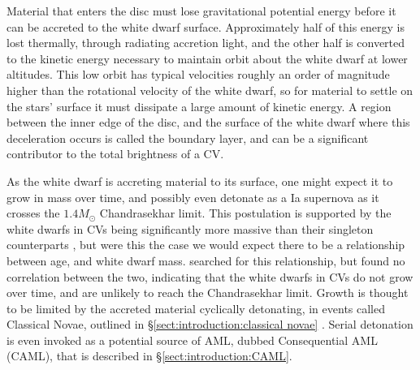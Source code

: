 Material that enters the disc must lose gravitational potential energy before it can be accreted to the white dwarf surface. Approximately half of this energy is lost thermally, through radiating accretion light, and the other half is converted to the kinetic energy necessary to maintain orbit about the white dwarf at lower altitudes. This low orbit has typical velocities roughly an order of magnitude higher than the rotational velocity of the white dwarf, so for material to settle on the stars' surface it must dissipate a large amount of kinetic energy. A region between the inner edge of the disc, and the surface of the white dwarf where this deceleration occurs is called the boundary layer, and can be a significant contributor to the total brightness of a CV. 

As the white dwarf is accreting material to its surface, one might expect it to grow in mass over time, and possibly even detonate as a Ia supernova as it crosses the $1.4 M_\odot$ Chandrasekhar limit. This postulation is supported by the white dwarfs in CVs being significantly more massive than their singleton counterparts , but were this the case we would expect there to be a relationship between age, and white dwarf mass. \citet{McAllister2019} searched for this relationship, but found no correlation between the two, indicating that the white dwarfs in CVs do not grow over time, and are unlikely to reach the Chandrasekhar limit. Growth is thought to be limited by the accreted material cyclically detonating, in events called Classical Novae, outlined in \S\ref{sect:introduction:classical novae} \citep{Wijnen2015,sparks2021}. Serial detonation is even invoked as a potential source of AML, dubbed Consequential AML (CAML), that is described in \S\ref{sect:introduction:CAML}.


